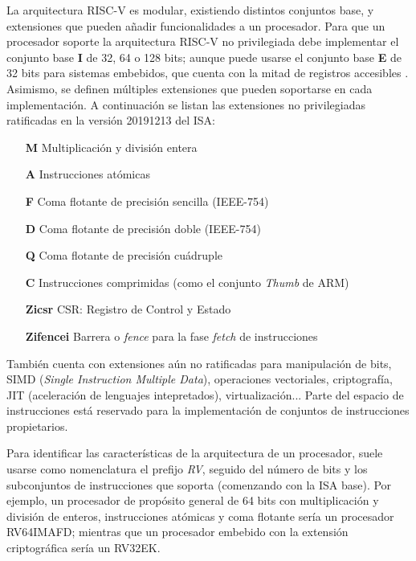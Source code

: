  La arquitectura RISC-V es modular, existiendo distintos conjuntos base, y extensiones que pueden añadir funcionalidades a un procesador. Para que un procesador soporte la arquitectura RISC-V no privilegiada debe implementar el conjunto base \textbf{I} de 32, 64 o 128 bits; aunque puede usarse el conjunto base \textbf{E} de 32 bits para sistemas embebidos, que cuenta con la mitad de registros accesibles \cite{RiscVSpec1}. Asimismo, se definen múltiples extensiones que pueden soportarse en cada implementación. A continuación se listan las extensiones no privilegiadas ratificadas en la versión 20191213 del ISA:

\begin{itemize}[noitemsep]
    \item[\textbf{M}] Multiplicación y división entera
    \item[\textbf{A}] Instrucciones atómicas
    \item[\textbf{F}] Coma flotante de precisión sencilla (IEEE-754)
    \item[\textbf{D}] Coma flotante de precisión doble (IEEE-754)
    \item[\textbf{Q}] Coma flotante de precisión cuádruple
    \item[\textbf{C}] Instrucciones comprimidas (como el conjunto \textit{Thumb} de ARM)
    \item[\textbf{Zicsr}] CSR: Registro de Control y Estado
    \item[\textbf{Zifencei}] Barrera o \textit{fence} para la fase \textit{fetch} de instrucciones
\end{itemize}

También cuenta con extensiones aún no ratificadas para manipulación de bits, SIMD (\textit{Single Instruction Multiple Data}), operaciones vectoriales, criptografía, JIT (aceleración de lenguajes intepretados), virtualización... Parte del espacio de instrucciones está reservado para la implementación de conjuntos de instrucciones propietarios.

Para identificar las características de la arquitectura de un procesador, suele usarse como nomenclatura el prefijo \textit{RV}, seguido del número de bits y los subconjuntos de instrucciones que soporta (comenzando con la ISA base). Por ejemplo, un procesador de propósito general de 64 bits con multiplicación y división de enteros, instrucciones atómicas y coma flotante sería un procesador RV64IMAFD; mientras que un procesador embebido con la extensión criptográfica sería un RV32EK.

